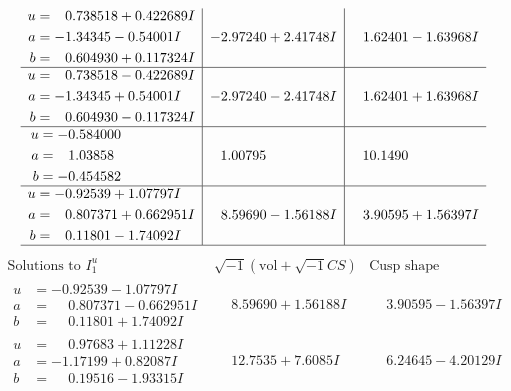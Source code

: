 \documentclass[1p]{elsarticle_modified}
\theoremstyle{definition}
\newcommand{\I}{\sqrt{-1}}
\begin{document}
$$\begin{array}{c|c|c}
\begin{aligned}
u &= \phantom{-}0.738518 + 0.422689 I \\
a &= -1.34345 - 0.54001 I \\
b &= \phantom{-}0.604930 + 0.117324 I\end{aligned}
 & -2.97240 + 2.41748 I & \phantom{-}1.62401 - 1.63968 I \\ \hline\begin{aligned}
u &= \phantom{-}0.738518 - 0.422689 I \\
a &= -1.34345 + 0.54001 I \\
b &= \phantom{-}0.604930 - 0.117324 I\end{aligned}
 & -2.97240 - 2.41748 I & \phantom{-}1.62401 + 1.63968 I \\ \hline\begin{aligned}
u &= -0.584000\phantom{ +0.000000I} \\
a &= \phantom{-}1.03858\phantom{ +0.000000I} \\
b &= -0.454582\phantom{ +0.000000I}\end{aligned}
 & \phantom{-}1.00795\phantom{ +0.000000I} & \phantom{-}10.1490\phantom{ +0.000000I} \\ \hline\begin{aligned}
u &= -0.92539 + 1.07797 I \\
a &= \phantom{-}0.807371 + 0.662951 I \\
b &= \phantom{-}0.11801 - 1.74092 I\end{aligned}
 & \phantom{-}8.59690 - 1.56188 I & \phantom{-}3.90595 + 1.56397 I\\
 \hline 
 \end{array}$$\newpage$$\begin{array}{c|c|c}  
\text{Solutions to }I^u_{1}& \I (\text{vol} + \sqrt{-1}CS) & \text{Cusp shape}\\
 \hline 
\begin{aligned}
u &= -0.92539 - 1.07797 I \\
a &= \phantom{-}0.807371 - 0.662951 I \\
b &= \phantom{-}0.11801 + 1.74092 I\end{aligned}
 & \phantom{-}8.59690 + 1.56188 I & \phantom{-}3.90595 - 1.56397 I \\ \hline\begin{aligned}
u &= \phantom{-}0.97683 + 1.11228 I \\
a &= -1.17199 + 0.82087 I \\
b &= \phantom{-}0.19516 - 1.93315 I\end{aligned}
 & \phantom{-}12.7535 + 7.6085 I & \phantom{-}6.24645 - 4.20129 I \\ \hline\begin{aligned}

\end{aligned}
\end{array}$$
\end{document}
